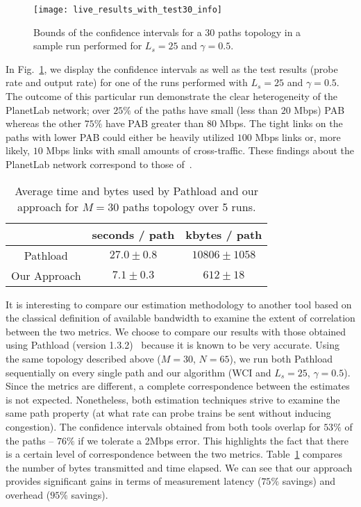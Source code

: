 \documentclass[final,5p,times,twocolumn]{elsarticle}
\begin{document}
\begin{figure}[!h]
	\centering
\texttt{[image: live\_results\_with\_test30\_info]}
	\caption{Bounds of the confidence intervals for a 30 paths topology in a sample run performed for $L_s=25$ and $\gamma=0.5$.	\label{fig:pl_exp_info}}
\end{figure}

In Fig.~\ref{fig:pl_exp_info}, we display the confidence intervals as well as the test results (probe rate and output rate) for one of the runs performed with $L_s=25$ and $\gamma=0.5$.  The outcome of this particular run demonstrate the clear heterogeneity of the PlanetLab network; over $25\%$ of the paths have small (less than $20$ Mbps) PAB whereas the other $75\%$ have PAB greater than $80$ Mbps.  The tight links on the paths with lower PAB could either be heavily utilized $100$ Mbps links or, more likely, $10$ Mbps links with small amounts of cross-traffic.  These findings about the PlanetLab network correspond to those of~\citet{lee:05}.



\begin{table}[!h]
	\caption{Average time and bytes used by Pathload and our approach for $M=30$ paths topology over 5 runs.\label{tab:pathload_info}}
	\centering
	\begin{tabular}{c|cc}
		& seconds / path & kbytes / path \\
		\hline
		Pathload & $27.0 \pm 0.8$ & $10806 \pm 1058$\\
		Our Approach & $7.1 \pm 0.3$ & $612 \pm 18$
	\end{tabular}
\end{table}

It is interesting to compare our estimation methodology to another tool based on the classical definition of available bandwidth to examine the extent of correlation between the two metrics.  We choose to compare our results with those obtained using Pathload (version 1.3.2)~\cite{jai:03} because it is known to be very accurate.  Using the same topology described above ($M=30$, $N=65$), we run both Pathload sequentially on every single path and our algorithm (WCI and $L_s=25$, $\gamma=0.5$).  Since the metrics are different, a complete correspondence between the estimates is not expected. Nonetheless, both estimation techniques strive to examine the same path property (at what rate can probe trains be sent without inducing congestion).  The confidence intervals obtained from both tools overlap for $53\%$ of the paths -- $76\%$ if we tolerate a 2Mbps error.  This highlights the fact that there is a certain level of correspondence between the two metrics.  Table~\ref{tab:pathload_info} compares  the number of bytes transmitted and time elapsed.  We can see that our approach provides significant gains in terms of measurement latency ($75\%$ savings) and overhead ($95\%$ savings).  
\end{document}
